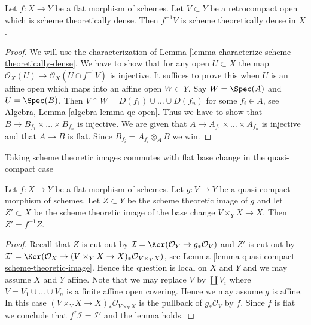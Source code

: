 \begin{lemma}
\label{lemma-flat-morphism-scheme-theoretically-dense-open}
Let $f : X \to Y$ be a flat morphism of schemes. Let $V \subset Y$ be
a retrocompact open which is scheme theoretically dense. Then $f^{-1}V$
is scheme theoretically dense in $X$.
\end{lemma}

\begin{proof}
We will use the characterization of
Lemma \ref{lemma-characterize-scheme-theoretically-dense}.
We have to show that for any open $U \subset X$ the map
$\mathcal{O}_X(U) \to \mathcal{O}_X(U \cap f^{-1}V)$ is injective.
It suffices to prove this when $U$ is an affine open which maps into
an affine open $W \subset Y$. Say $W = \Spec(A)$ and $U = \Spec(B)$.
Then $V \cap W = D(f_1) \cup \ldots \cup D(f_n)$ for some
$f_i \in A$, see
Algebra, Lemma \ref{algebra-lemma-qc-open}.
Thus we have to show that
$B \to B_{f_1} \times \ldots \times B_{f_n}$ is injective.
We are given that $A \to A_{f_1} \times \ldots \times A_{f_n}$ is injective
and that $A \to B$ is flat. Since $B_{f_i} = A_{f_i} \otimes_A B$ we win.
\end{proof}

\begin{lemma}
\label{lemma-flat-base-change-scheme-theoretic-image}
\begin{slogan}
Taking scheme theoretic images commutes with flat base change
in the quasi-compact case
\end{slogan}
Let $f : X \to Y$ be a flat morphism of schemes. Let $g : V \to Y$ be a
quasi-compact morphism of schemes. Let $Z \subset Y$ be the scheme theoretic
image of $g$ and let $Z' \subset X$ be the scheme theoretic image of the
base change $V \times_Y X \to X$. Then $Z' = f^{-1}Z$.
\end{lemma}

\begin{proof}
Recall that $Z$ is cut out by
$\mathcal{I} = \Ker(\mathcal{O}_Y \to g_*\mathcal{O}_V)$
and $Z'$ is cut out by
$\mathcal{I}' = \Ker(\mathcal{O}_X \to
(V \times_Y X \to X)_*\mathcal{O}_{V \times_Y X})$, see
Lemma \ref{lemma-quasi-compact-scheme-theoretic-image}.
Hence the question is local on $X$ and $Y$ and we may assume $X$ and $Y$
affine. Note that we may replace $V$ by $\coprod V_i$ where
$V = V_1 \cup \ldots \cup V_n$ is a finite affine open covering.
Hence we may assume $g$ is affine. In this case
$(V \times_Y X \to X)_*\mathcal{O}_{V \times_Y X}$ is the pullback
of $g_*\mathcal{O}_V$ by $f$. Since $f$ is flat we conclude that
$f^*\mathcal{I} = \mathcal{I}'$ and the lemma holds.
\end{proof}




